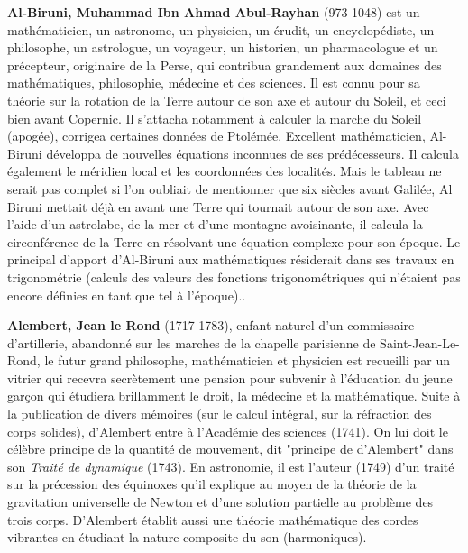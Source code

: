 \pichskip{15pt}%
\textbf{Al-Biruni, Muhammad Ibn Ahmad Abul-Rayhan} (973-1048) est un mathématicien, un astronome, un physicien, un érudit, un encyclopédiste, un philosophe, un astrologue, un voyageur, un historien, un pharmacologue et un précepteur, originaire de la Perse, qui contribua grandement aux domaines des mathématiques, philosophie, médecine et des sciences. Il est connu pour sa théorie sur la rotation de la Terre autour de son axe et autour du Soleil, et ceci bien avant Copernic. Il s'attacha notamment à calculer la marche du Soleil (apogée), corrigea certaines données de Ptolémée. Excellent mathématicien, Al-Biruni développa de nouvelles équations inconnues de ses prédécesseurs. Il calcula également le méridien local et les coordonnées des localités. Mais le tableau ne serait pas complet si l'on oubliait de mentionner que six siècles avant Galilée, Al Biruni mettait déjà en avant une Terre qui tournait autour de son axe. Avec l'aide d'un astrolabe, de la mer et d'une montagne avoisinante, il calcula la circonférence de la Terre en résolvant une équation complexe pour son époque. Le principal d'apport d'Al-Biruni aux mathématiques résiderait dans ses travaux en trigonométrie (calculs des valeurs des fonctions trigonométriques qui n'étaient pas encore définies en tant que tel à l'époque)..

\pichskip{15pt}%
\textbf{Alembert, Jean le Rond} (1717-1783), enfant naturel d'un commissaire d'artillerie, abandonné sur les marches de la chapelle parisienne de Saint-Jean-Le-Rond, le futur grand philosophe, mathématicien et physicien est recueilli par un vitrier qui recevra secrètement une pension pour subvenir à l'éducation du jeune garçon qui étudiera brillamment le droit, la médecine et la mathématique. Suite à la publication de divers mémoires (sur le calcul intégral, sur la réfraction des corps solides), d'Alembert entre à l'Académie des sciences (1741). On lui doit le célèbre principe de la quantité de mouvement, dit "principe de d'Alembert" dans son \textit{Traité de dynamique} (1743). En astronomie, il est l'auteur (1749) d'un traité sur la précession des équinoxes qu'il explique au moyen de la théorie de la gravitation universelle de Newton et d'une solution partielle au problème des trois corps. D'Alembert établit aussi une théorie mathématique des cordes vibrantes en étudiant la nature composite du son (harmoniques).

